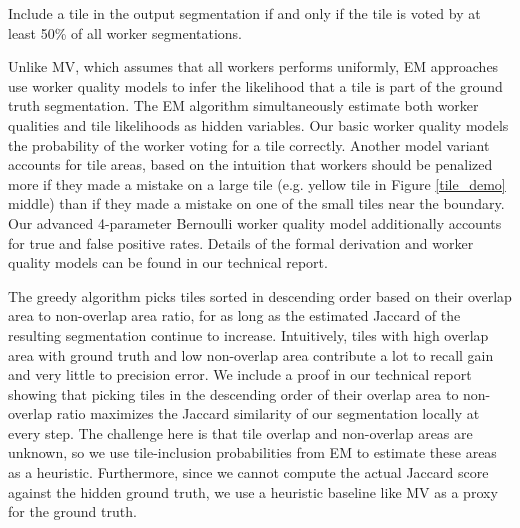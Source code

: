 \par \noindent Include a tile in the output segmentation if and only if the tile is voted by at least 50\% of all worker segmentations.

\par \noindent Unlike MV, which assumes that all workers performs uniformly, EM approaches use worker quality models to infer the likelihood that a tile is part of the ground truth segmentation. The EM algorithm simultaneously estimate both worker qualities and tile likelihoods as hidden variables. Our basic worker quality models the probability of the worker voting for a tile correctly. Another model variant accounts for tile areas, based on the intuition that workers should be penalized more if they made a mistake on a large tile (e.g. yellow tile in Figure \ref{tile_demo} middle) than if they made a mistake on one of the small tiles near the boundary. Our advanced 4-parameter Bernoulli worker quality model additionally accounts for true and false positive rates. Details of the formal derivation and worker quality models can be found in our technical report.

\par \noindent The greedy algorithm picks tiles sorted in descending order based on their overlap area to non-overlap area ratio, for as long as the estimated Jaccard of the resulting segmentation continue to increase. Intuitively, tiles with high overlap area with ground truth and low non-overlap area contribute a lot to recall gain and very little to precision error. We include a proof in our technical report showing that picking tiles in the descending order of their overlap area to non-overlap ratio maximizes the Jaccard similarity of our segmentation locally at every step. The challenge here is that tile overlap and non-overlap areas are unknown, so we use tile-inclusion probabilities from EM to estimate these areas as a heuristic. Furthermore, since we cannot compute the actual Jaccard score against the hidden ground truth, we use a heuristic baseline like MV as a proxy for the ground truth.

